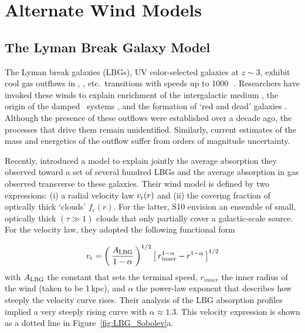 \documentclass[12pt,preprint]{aastex}
\begin{document}
\section{Alternate Wind Models}
\label{sec:alternate}

\subsection{The Lyman Break Galaxy Model}
\label{sec:lbg}

The Lyman break galaxies (LBGs), UV color-selected galaxies at $z \sim 3$,
exhibit cool gas outflows in , ,
etc.\ transitions with speeds up to 1000\,\kms\
\citep[e.g.][]{lkg+97,pks+98}.
Researchers have invoked these winds to explain enrichment of
the intergalactic medium \citep[e.g.][]{aguirre,spa+06}, the origin of the
damped \lya\ systems \citep{nbf98,schaye01a}, and the formation of
`red and dead' galaxies \citep[e.g.][]{redgal}.  Although the
presence of these outflows were established over a decade ago,
the processes that drive them remain
unidentified.  Similarly,  current estimates of the mass and energetics of the
outflow suffer from orders of magnitude uncertainty.

Recently, \citet[][; hereafter S10]{steidel+10} introduced a model to
explain jointly the average absorption they observed
toward a set of several hundred LBGs and the average absorption in gas
observed transverse to these galaxies.  
Their wind model is defined by two
expressions: (i) a radial velocity law $v_{\rm r}(r)$ and (ii) the covering
fraction of optically thick `clouds' $f_c(r)$.  For the latter, S10
envision an 
ensemble of small, optically thick $(\tau \gg 1)$ clouds that only
partially cover a galactic-scale source.
For the velocity law, they adopted the following functional
form

\begin{equation}
v_{\rm r} = \left ( \, \frac{A_{\rm LBG}}{1-\alpha} \, \right )^{1/2} \left [ \, r_{\rm
  inner}^{1-\alpha} - r^{1-\alpha} \, \right ]^{1/2}
\label{eqn:LBG_vlaw}
\end{equation}
with $A_{\rm LBG}$ the constant that sets the terminal speed,
$r_{inner}$ the inner radius of the wind (taken to be 1\,kpc), and
$\alpha$ the power-law exponent that describes how steeply the velocity curve rises.  Their
analysis of the LBG absorption profiles implied
a very steeply rising curve with $\alpha \approx 1.3$.
This velocity expression is shown as a dotted line in 
Figure~\ref{fig:LBG_Sobolev}a.  
\end{document}
